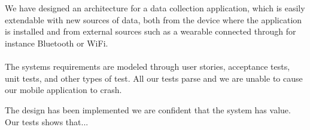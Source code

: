 \\\\
We have designed an architecture for a data collection application, which is easily extendable with new sources of data, both from the device where the application is installed and from external sources such as a wearable connected through for instance Bluetooth or WiFi.
\\\\


The systems requirements are modeled through user stories, acceptance tests, unit tests, and other types of test. All our tests parse and we are unable to cause our mobile application to crash. 


The design has been implemented we are confident that the system has value. Our tests shows that... 



